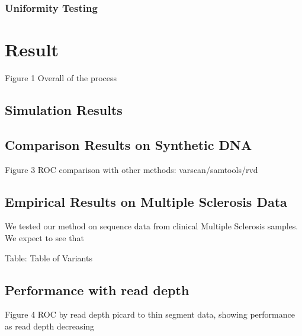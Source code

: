 \documentclass[11pt,reqno]{amsart}
\begin{document}
\subsubsection{Uniformity Testing}

\section{Result}
Figure 1 Overall of the process
\subsection{Simulation Results}
\subsection{Comparison Results on Synthetic DNA}
Figure 3 ROC comparison with other methods: varscan/samtools/rvd
\subsection{Empirical Results on Multiple Sclerosis Data}
We tested our method on sequence data from clinical Multiple Sclerosis samples. We expect to see that 

Table: Table of Variants
\subsection{Performance with read depth}
Figure 4 ROC by read depth
picard to thin segment data, showing performance as read depth decreasing




\end{document}
